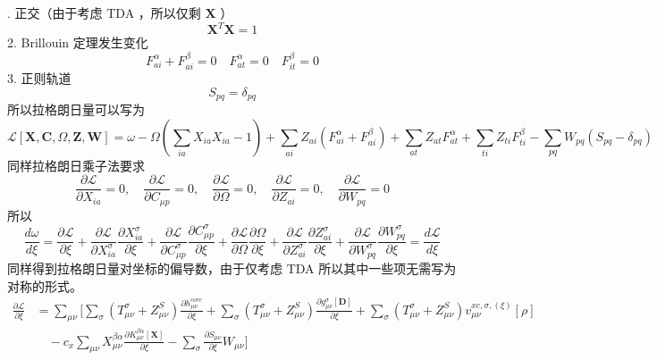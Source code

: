 \documentclass[11pt]{ctexart}
\numberwithin{equation}{section}
\begin{document}
. 正交（由于考虑 TDA ，所以仅剩 $\mathbf{X}$ ）
\begin{equation}
    \mathbf{X}^{T}\mathbf{X} = 1
\end{equation}
2. Brillouin 定理发生变化
\begin{equation}
    F_{ai}^{\alpha}+F_{ai}^{\beta} = 0
    \quad F_{at}^{\alpha} = 0
    \quad F_{it}^{\beta} = 0
\end{equation}
3. 正则轨道
\begin{equation}
    S_{pq} = \delta_{pq}
\end{equation}
所以拉格朗日量可以写为
\begin{equation}
    \mathcal{L}[\mathbf{X},\mathbf{C},\Omega,\mathbf{Z},\mathbf{W}]
    = \omega 
    - \Omega(\sum_{ia}X_{ia}X_{ia}-1)
    + \sum_{ai}Z_{ai}(F_{ai}^{\alpha}+F_{ai}^{\beta})
    + \sum_{at}Z_{at}F_{at}^{\alpha}
    + \sum_{ti}Z_{ti}F_{ti}^{\beta}
    - \sum_{pq}W_{pq}(S_{pq}-\delta_{pq})
\end{equation}
同样拉格朗日乘子法要求
\begin{equation}
    \frac{\partial \mathcal{L}}{\partial X_{ia}} = 0,
    \quad \frac{\partial \mathcal{L}}{\partial C_{\mu p}} = 0,
    \quad \frac{\partial \mathcal{L}}{\partial \Omega} = 0 ,
    \quad \frac{\partial \mathcal{L}}{\partial Z_{ai}} = 0 ,
    \quad \frac{\partial \mathcal{L}}{\partial W_{pq}} = 0 
\end{equation}
所以
\begin{equation}
    \frac{d \omega}{d \xi} 
    = \frac{\partial\mathcal{L}}{\partial \xi}
    + \frac{\partial\mathcal{L}}{\partial X_{ia}^{\sigma}}\frac{\partial X_{ia}^{\sigma}}{\partial \xi}
    + \frac{\partial\mathcal{L}}{\partial C_{\mu p}^{\sigma}}\frac{\partial C_{\mu p}^{\sigma}}{\partial \xi}
    + \frac{\partial\mathcal{L}}{\partial \Omega}\frac{\partial \Omega}{\partial \xi}
    + \frac{\partial\mathcal{L}}{\partial Z_{ai}^{\sigma}}\frac{\partial Z_{ai}^{\sigma}}{\partial \xi}
    + \frac{\partial\mathcal{L}}{\partial W_{pq}^{\sigma}}\frac{\partial W_{pq}^{\sigma}}{\partial \xi}
    = \frac{d \mathcal{L}}{d\xi}
\end{equation}
同样得到拉格朗日量对坐标的偏导数，由于仅考虑 TDA 所以其中一些项无需写为对称的形式。
\begin{equation}\label{eq:ROKS USF partial L}
    \begin{aligned}
        \frac{\partial\mathcal{L}}{\partial\xi} 
        &= \sum_{\mu\nu}\Bigg[
            \sum_{\sigma}(T_{\mu\nu}^{\sigma}+Z_{\mu\nu}^{S})\frac{\partial h_{\mu\nu}^{core}}{\partial\xi}
            + \sum_{\sigma}(T_{\mu\nu}^{\sigma}+Z_{\mu\nu}^{S})\frac{\partial g_{\mu\nu}^{\sigma}[\mathbf{D}]}{\partial\xi}
            +\sum_{\sigma}(T_{\mu\nu}^{\sigma}+Z_{\mu\nu}^{S})v_{\mu\nu}^{xc,\sigma,(\xi)}[\rho]\\
            &\quad - c_x\sum_{\mu\nu}X_{\mu\nu}^{\beta\alpha}\frac{\partial K_{\mu\nu}^{\beta\alpha}[\mathbf{X}]}{\partial\xi}
            - \sum_{\sigma}\frac{\partial S_{\mu\nu}}{\partial\xi} W_{\mu\nu}
        \Bigg]
    \end{aligned}
\end{equation}
\end{document}
